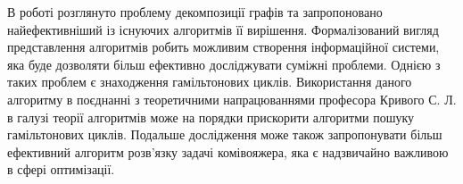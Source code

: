 В роботі розглянуто проблему декомпозиції графів та запропоновано найефективніший із існуючих алгоритмів її вирішення.
Формалізований вигляд представлення алгоритмів робить можливим створення інформаційної системи, яка буде дозволяти більш ефективно досліджувати суміжні проблеми.
Однією з таких проблем є знаходження гамільтонових циклів.
Використання даного алгоритму в поєднанні з теоретичними напрацюваннями професора Кривого С. Л. в галузі теорії алгоритмів може на порядки прискорити алгоритми пошуку гамільтонових циклів.
Подальше дослідження може також запропонувати більш ефективний алгоритм розв'язку задачі комівояжера, яка є надзвичайно важливою в сфері оптимізації.
